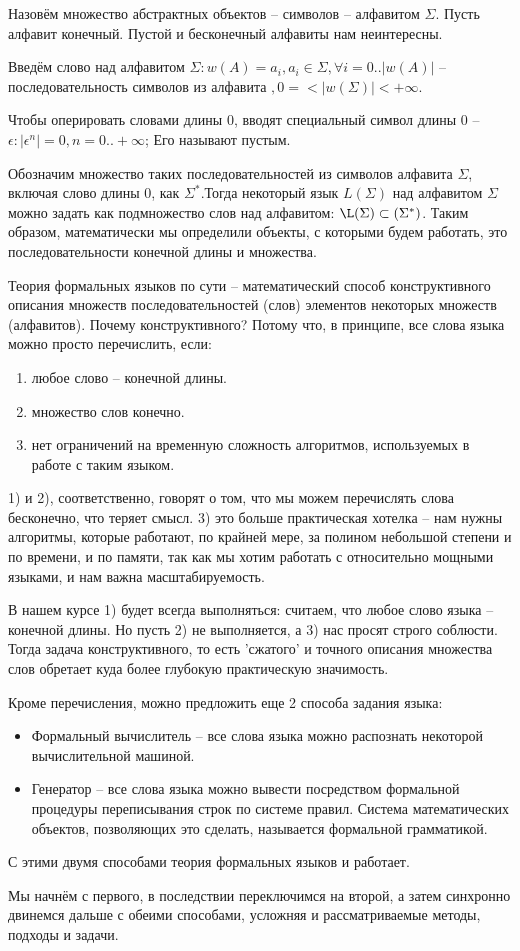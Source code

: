  Назовём множество абстрактных объектов -- символов -- алфавитом $\Sigma$. Пусть алфавит конечный. Пустой и бесконечный алфавиты нам неинтересны.

Введём слово над алфавитом $\Sigma: w(A)={a_i, a_i \in \Sigma, \forall i=0..|w(A)|}$ -- последовательность символов из алфавита $, 0 =< |w(\Sigma)| <+\infty$.

Чтобы оперировать словами длины 0, вводят специальный символ длины 0 -- $\epsilon:|\epsilon^n|=0, n=0..+\infty$; Его называют пустым.

Обозначим множество таких последовательностей из символов алфавита $\Sigma$, включая слово длины 0, как $\Sigma^*$.Тогда некоторый язык $L(\Sigma)$ над алфавитом $\Sigma$ можно задать как подмножество слов над алфавитом: $\L(\Sigma)\subset(\Sigma^*)$. Таким образом, математически мы определили объекты, с которыми будем работать, это последовательности конечной длины и множества.

Теория формальных языков по сути -- математический способ конструктивного описания множеств последовательностей (слов) элементов некоторых множеств (алфавитов). Почему конструктивного? Потому что, в принципе, все слова языка можно просто перечислить, если:
\begin{enumerate}
\item любое слово -- конечной длины.
\item множество слов конечно.
\item нет ограничений на временную сложность алгоритмов, используемых в работе с таким языком.
\end{enumerate}
1) и 2), соответственно, говорят о том, что мы можем перечислять слова бесконечно, что теряет смысл. 3) это больше практическая хотелка -- нам нужны алгоритмы, которые работают, по крайней мере, за полином небольшой степени и по времени, и по памяти, так как мы хотим работать с относительно мощными языками, и нам важна масштабируемость.

В нашем курсе 1) будет всегда выполняться: считаем, что любое слово языка -- конечной длины. Но пусть 2) не выполняется, а 3) нас просят строго соблюсти. Тогда задача конструктивного, то есть 'сжатого' и точного описания множества слов обретает куда более глубокую практическую значимость.

Кроме перечисления, можно предложить еще 2 способа задания языка:
\begin{itemize}
\item Формальный вычислитель -- все слова языка можно распознать некоторой вычислительной машиной.
\item Генератор -- все слова языка можно вывести посредством формальной процедуры переписывания строк по системе правил. Система математических объектов, позволяющих это сделать, называется формальной грамматикой.
\end{itemize}
С этими двумя способами теория формальных языков и работает.

Мы начнём с первого, в последствии переключимся на второй, а затем синхронно двинемся дальше с обеими способами, усложняя и рассматриваемые методы, подходы и задачи.
